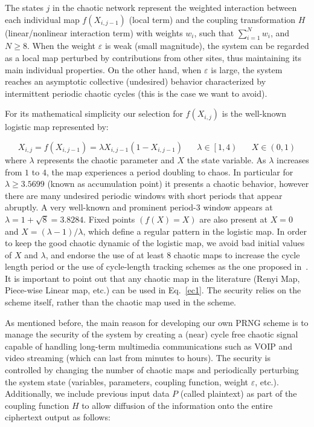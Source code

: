 \documentclass[preprint]{elsarticle}
\begin{document}
The states $j$ in the chaotic network represent the weighted interaction between each individual map $f(X_{i,j-1})$ (local term) and the coupling transformation $H$ (linear/nonlinear interaction term) with weights $w_{i}$, such that $\sum_{i=1}^{N}w_{i}$, and $N \geq 8$. When the weight $\varepsilon$ is weak (small magnitude), the system can be regarded as a local map perturbed by contributions from other sites, thus maintaining its main individual properties. On the other hand, when $\varepsilon$ is large, the system reaches an asymptotic collective (undesired) behavior characterized by intermittent periodic chaotic cycles (this is the case we want to avoid).

For its mathematical simplicity our selection for $f(X_{i,j})$ is the well-known logistic map represented by:

\begin{equation}
\displaystyle{
X_{i,j}= f(X_{i,j-1})= \lambda X_{i,j-1}(1-X_{i,j-1}) \; \; \; \;\; \; \lambda \in \left[ 1,4 \right) \; \;  \;\;\; \; X \in \left( 0,1 \right)
}
\label{ec2}
\end{equation}
where $\lambda$ represents the chaotic parameter and $X$ the state variable. As $\lambda$ increases from $1$ to $4$, the map experiences a period doubling to chaos. In particular for $\lambda \geq 3.5699$ (known as accumulation point) it presents a chaotic behavior, however there are many undesired periodic windows with short periods that appear abruptly. A very well-known and prominent period-3 window appears at $\lambda = 1+ \sqrt{8}= 3.8284$. Fixed points $(f(X)=X)$ are also present at $X=0$ and $X=(\lambda -1)/\lambda$, which define a regular pattern in the logistic map. In order to keep the good chaotic dynamic of the logistic map, we avoid bad initial values of $X$ and $\lambda$, and endorse the use of at least 8 chaotic maps to increase the cycle length period or the use of cycle-length tracking schemes as the one proposed in~\cite{Hasimoto2011}. It is important to point out that any chaotic map in the literature (Renyi Map, Piece-wise Linear map, etc.) can be used in Eq.~\ref{ec1}. The security relies on the scheme itself, rather than the chaotic map used in the scheme.

As mentioned before, the main reason for developing our own PRNG scheme is to manage the security of the system by creating a (near) cycle free chaotic signal capable of handling long-term multimedia communications such as VOIP and video streaming (which can last from minutes to hours). The security is controlled by changing the number of chaotic maps and periodically perturbing the system state (variables, parameters, coupling function, weight $\varepsilon$, etc.). Additionally, we include previous input data $P$ (called plaintext) as part of the coupling function $H$ to allow diffusion of the information onto the entire ciphertext output as follows:
\end{document}
